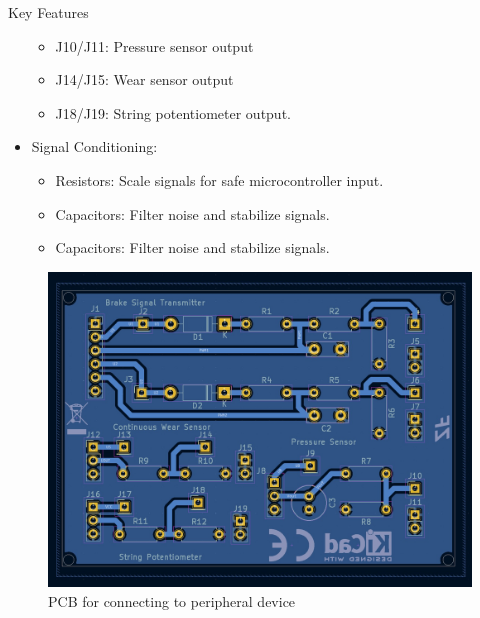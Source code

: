 \documentclass[8pt,compress,aspectratio=169]{beamer}
\begin{document}
\begin{frame}
\begin{minipage}{0.5\textwidth}
\begin{block}{Key Features}
\begin{itemize}
\begin{itemize}
            \item J10/J11: Pressure sensor output
            \item J14/J15: Wear sensor output
            \item J18/J19: String potentiometer output.
          \end{itemize}
        \item Signal Conditioning:
          \begin{itemize}
              \footnotesize
            \item Resistors: Scale signals for safe microcontroller input.
            \item Capacitors: Filter noise and stabilize signals.
            \item Capacitors: Filter noise and stabilize signals.
          \end{itemize}
      \end{itemize}
    \end{block}
  \end{minipage}
  \hfill
  \begin{minipage}{0.45\textwidth}
    \begin{figure}
      \includegraphics[width=\textwidth]{assets/electronic/peri_pcb.jpg}
      \caption{PCB for connecting to peripheral device}
    \end{figure}
  \end{minipage}
\end{frame}
\end{document}
